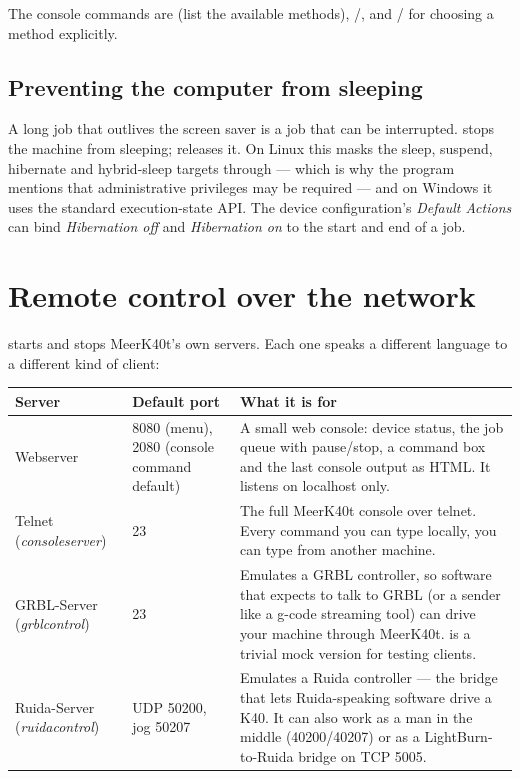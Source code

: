 \noindent The console commands are  (list the available methods),
/, and
/ for choosing a
method explicitly.

\subsection*{Preventing the computer from sleeping}

A long job that outlives the screen saver is a job that can be interrupted.
 stops the machine from sleeping;
 releases it. On Linux this masks the sleep, suspend,
hibernate and hybrid-sleep targets through  --- which is why the
program mentions that administrative privileges may be required --- and on Windows
it uses the standard execution-state API. The device configuration's
\emph{Default Actions} can bind \emph{Hibernation off} and \emph{Hibernation on}
to the start and end of a job.

\section{Remote control over the network}

 starts and stops MeerK40t's own servers. Each one speaks a
different language to a different kind of client:

\begin{center}\small
\begin{tabular}{@{}L{3.2cm}L{3.0cm}L{8.0cm}@{}}
\toprule
\textbf{Server} & \textbf{Default port} & \textbf{What it is for} \\
\midrule
Webserver & 8080 (menu), 2080 (console command default) & A small web console:
device status, the job queue with pause/stop, a command box and the last console
output as HTML. It listens on localhost only. \\
Telnet (\emph{consoleserver}) & 23 & The full MeerK40t console over telnet. Every
command you can type locally, you can type from another machine. \\
GRBL-Server (\emph{grblcontrol}) & 23 & Emulates a GRBL controller, so software
that expects to talk to GRBL (or a sender like a g-code streaming tool) can drive
your machine through MeerK40t.  is a trivial mock version for
testing clients. \\
Ruida-Server (\emph{ruidacontrol}) & UDP 50200, jog 50207 & Emulates a Ruida
controller --- the bridge that lets Ruida-speaking software drive a K40. It can
also work as a man in the middle (40200/40207) or as a LightBurn-to-Ruida bridge
on TCP 5005. \\
\bottomrule
\end{tabular}
\end{center}

